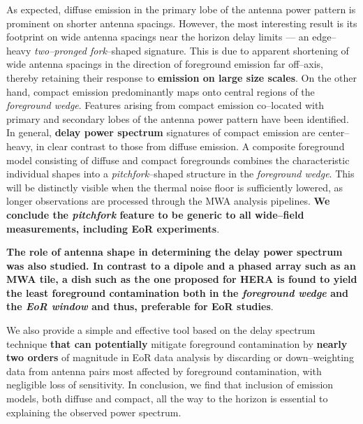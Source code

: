 \documentclass[preprint2,iop,numberedappendix]{emulateapj}
\begin{document}
As expected, diffuse emission in the primary lobe of the antenna power pattern is prominent on shorter antenna spacings. However, the most interesting result is its footprint on wide antenna spacings near the horizon delay limits --- an edge--heavy {\it two--pronged fork}--shaped signature. This is due to apparent shortening of wide antenna spacings in the direction of foreground emission far off--axis, thereby retaining their response to {\bf emission on large size scales}. On the other hand, compact emission predominantly maps onto central regions of the {\it foreground wedge}. Features arising from compact emission co--located with primary and secondary lobes of the antenna power pattern have been identified. In general, {\bf delay power spectrum} signatures of compact emission are center--heavy, in clear contrast to those from diffuse emission. A composite foreground model consisting of diffuse and compact foregrounds combines the characteristic individual shapes into a {\it pitchfork}--shaped structure in the {\it foreground wedge}. This will be distinctly visible when the thermal noise floor is sufficiently lowered, as longer observations are processed through the MWA analysis pipelines. {\bf We conclude the {\it pitchfork} feature to be generic to all wide--field measurements, including EoR experiments}. 

{\bf The role of antenna shape in determining the {\bf delay power spectrum} was also studied. In contrast to a dipole and a phased array such as an MWA tile, a dish such as the one proposed for HERA is found to yield the least foreground contamination both in the {\it foreground wedge} and the {\it EoR window} and thus, preferable for EoR studies}.

We also provide a simple and effective tool based on the delay spectrum technique {\bf that can potentially} mitigate foreground contamination by {\bf nearly two orders} of magnitude in EoR data analysis by discarding or down--weighting data from antenna pairs most affected by foreground contamination, with negligible loss of sensitivity. In conclusion, we find that inclusion of emission models, both diffuse and compact, all the way to the horizon is essential to explaining the observed power spectrum. 

\acknowledgments
\end{document}
